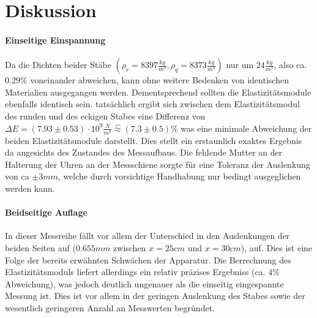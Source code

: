 \section{Diskussion}
\label{sec:Diskussion}

\paragraph{Einseitige Einspannung}

Da die Dichten beider Stäbe $\left(\rho_r =8397 \frac{kg}{m^3}, \rho_q = 8373 \frac{kg}{m^3}\right)$ nur um $24 \frac{kg}{m^3}$, also ca. $0.29 \%$ voneinander abweichen, kann ohne weitere Bedenken von identischen Materialien ausgegangen werden. Dementsprechend sollten die Elastizitätsmodule ebenfalls identisch sein. tatsächlich ergibt sich zwischen dem Elastizitätsmodul des runden und des eckigen Stabes eine Differenz von $\Delta E = \left(7.93 \pm 0.53 \right) \cdot 10^{9} \frac{N}{m^2} \hat{\approx} (7.3 \pm 0.5) \% $ was eine minimale Abweichung der beiden Elastizitätsmodule darstellt. Dies stellt ein erstaunlich exaktes Ergebnis da angesichts des Zustandes des Messaufbaus. Die fehlende Mutter an der Halterung der Uhren an der Messschiene sorgte für eine Toleranz der Auslenkung von ca $\pm 3mm$, welche durch vorsichtige Handhabung nur bedingt ausgeglichen werden kann.

\paragraph{Beidseitige Auflage}

In dieser Messreihe fällt vor allem der Unterschied in den Auslenkungen der beiden Seiten auf ($0.655mm$ zwischen $x=25cm$ und $x = 30cm$), auf. Dies ist eine Folge der bereits erwähnten Schwächen der Apparatur.
Die Berrechnung des Elastizitätsmoduls liefert allerdings ein relativ präzises Ergebniss (ca. $4 \%$ Abweichung), was jedoch deutlich ungenauer als die einseitig eingespannte Messung ist. Dies ist vor allem in der geringen Auslenkung des Stabes sowie der wesentlich geringeren Anzahl an Messwerten begründet.
